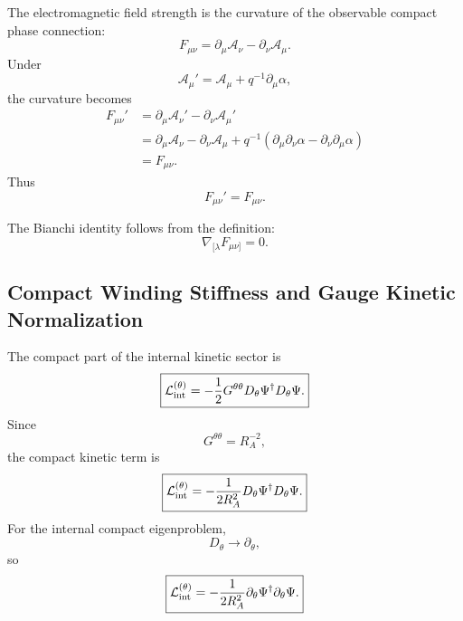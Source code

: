 \documentclass[11pt]{article}
\begin{document}
The electromagnetic field strength is the curvature of the observable compact
phase connection:
\begin{equation}
\boxed{
F_{\mu\nu}
=
\partial_\mu\mathcal A_\nu
-
\partial_\nu\mathcal A_\mu.
}
\end{equation}
Under
\begin{equation}
\mathcal A_\mu'
=
\mathcal A_\mu+q^{-1}\partial_\mu\alpha,
\end{equation}
the curvature becomes
\begin{align}
F_{\mu\nu}'
&=
\partial_\mu\mathcal A_\nu'
-
\partial_\nu\mathcal A_\mu'
\\
&=
\partial_\mu\mathcal A_\nu
-
\partial_\nu\mathcal A_\mu
+
q^{-1}
\left(
\partial_\mu\partial_\nu\alpha
-
\partial_\nu\partial_\mu\alpha
\right)
\\
&=
F_{\mu\nu}.
\end{align}
Thus
\begin{equation}
\boxed{
F_{\mu\nu}'=F_{\mu\nu}.
}
\end{equation}

The Bianchi identity follows from the definition:
\begin{equation}
\boxed{
\nabla_{[\lambda}F_{\mu\nu]}=0.
}
\end{equation}

\subsection{Compact Winding Stiffness and Gauge Kinetic Normalization}

The compact part of the internal kinetic sector is
\begin{equation}
\boxed{
\mathcal L_{\rm int}^{(\theta)}
=
-\frac12
G^{\theta\theta}
D_\theta\Psi^\dagger D_\theta\Psi.
}
\end{equation}
Since
\begin{equation}
\boxed{
G^{\theta\theta}
=
R_A^{-2},
}
\end{equation}
the compact kinetic term is
\begin{equation}
\boxed{
\mathcal L_{\rm int}^{(\theta)}
=
-\frac{1}{2R_A^2}
D_\theta\Psi^\dagger D_\theta\Psi.
}
\end{equation}
For the internal compact eigenproblem,
\begin{equation}
D_\theta\rightarrow\partial_\theta,
\end{equation}
so
\begin{equation}
\boxed{
\mathcal L_{\rm int}^{(\theta)}
=
-\frac{1}{2R_A^2}
\partial_\theta\Psi^\dagger\partial_\theta\Psi.
}
\end{equation}
\end{document}
